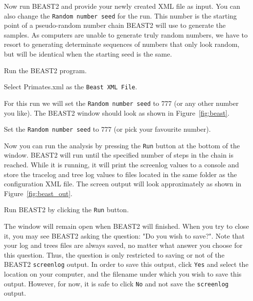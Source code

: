 \documentclass[11pt]{article}
\begin{document}
Now run BEAST2 and provide your newly created XML file as input. You can also change the \texttt{Random number seed} for the run. This number is the starting point of a pseudo-random number chain BEAST2 will use to generate the samples. As computers are unable to generate truly random numbers, we have to resort to generating determinate sequences of numbers that only look random, but will be identical when the starting seed is the same.

\begin{framed}
Run the BEAST2 program.

Select Primates.xml as the \texttt{Beast XML File}.
\end{framed}

For this run we will set the \texttt{Random number seed} to 777 (or any other number you like). The BEAST2 window should look as shown in Figure~\ref{fig:beast}. 

\begin{framed}
Set the \texttt{Random number seed} to 777 (or pick your favourite number).
\end{framed}

Now you can run the analysis by pressing the \texttt{Run} button at the bottom of the window. BEAST2 will run until the specified number of steps in the chain is reached. While it is running, it will print the screenlog values to a console and store the tracelog and tree log values to files located in the same folder as the configuration XML file. The screen output will look approximately as shown in Figure~\ref{fig:beast_out}.

\begin{framed}
Run BEAST2 by clicking the \texttt{Run} button.
\end{framed}

The window will remain open when BEAST2 will finished. When you try to close it, you may see BEAST2 asking the question: "Do you wish to save?". Note that your log and trees files are always saved, no matter what answer you choose for this question. Thus, the question is only restricted to saving or not of the BEAST2 \texttt{screenlog} output. In order to save this output, click \texttt{Yes} and select the location on your computer, and the filename under which you wish to save this output. However, for now, it is safe to click \texttt{No} and not save the \texttt{screenlog} output.
\end{document}
